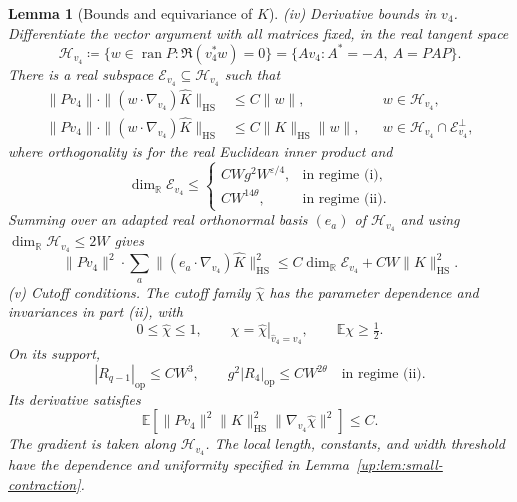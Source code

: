 \documentclass[11pt]{article}
\numberwithin{equation}{section}
\newtheorem{lemma}[theorem]{Lemma}
\theoremstyle{remark}
\newcommand{\E}{\mathbb E}
\newcommand{\R}{\mathbb R}
\newcommand{\ran}{\operatorname{ran}}
\newcommand{\HS}{\mathrm{HS}}
\begin{document}
\begin{lemma}[Bounds and equivariance of $K$]
\smallskip\noindent
\textup{(iv) Derivative bounds in $v_4$.}
Differentiate the vector argument with all matrices fixed, in the real
tangent space
\[
 \mathcal H_{v_4}\coloneqq\{w\in\ran P:\Re(v_4^*w)=0\}
 =\{Av_4:A^*=-A,\ A=PAP\}.
\]
There is a real subspace $\mathcal E_{v_4}\subseteq\mathcal H_{v_4}$ such that
\begin{equation}\label{su:eq:pair-source-regularity}
 \begin{aligned}
 \|Pv_4\|\cdot\|(w\cdot\nabla_{v_4})\widehat K\|_{\HS}
   &\le C\|w\|,&&w\in\mathcal H_{v_4},\\
 \|Pv_4\|\cdot\|(w\cdot\nabla_{v_4})\widehat K\|_{\HS}
   &\le C\|K\|_{\HS}\|w\|,
       &&w\in\mathcal H_{v_4}\cap\mathcal E_{v_4}^\perp,
 \end{aligned}
\end{equation}
where orthogonality is for the real Euclidean inner product and
\begin{equation}\label{su:eq:pair-exceptional-dimension}
 \dim_{\R}\mathcal E_{v_4}\le
 \begin{cases}
 CWg^2W^{\varepsilon/4},&\text{in regime (i)},\\
 CW^{14\theta},&\text{in regime (ii)}.
 \end{cases}
\end{equation}
Summing over an adapted real orthonormal basis $(e_a)$ of
$\mathcal H_{v_4}$ and using $\dim_{\R}\mathcal H_{v_4}\le2W$ gives
\begin{equation}\label{su:eq:pair-source-derivative-sum}
 \|Pv_4\|^2\cdot\sum_a
 \|(e_a\cdot\nabla_{v_4})\widehat K\|_{\HS}^2
 \le C\dim_{\R}\mathcal E_{v_4}+CW\|K\|_{\HS}^2.
\end{equation}
\smallskip\noindent
\textup{(v) Cutoff conditions.}
The cutoff family $\widehat\chi$ has the parameter dependence and
invariances in part (ii), with
\[
 0\le\widehat\chi\le1,\qquad
 \chi=\left.\widehat\chi\right|_{\widehat v_4=v_4},\qquad
 \E\chi\ge\tfrac12.
\]
On its support,
\[
 |R_{q-1}|_{\mathrm{op}}\le CW^3,\qquad
 g^2|R_4|_{\mathrm{op}}\le CW^{2\theta}\quad\text{in regime (ii)}.
\]
Its derivative satisfies
\begin{equation}\label{su:eq:pair-cutoff-derivative}
 \E\left[\|Pv_4\|^2\|K\|_{\HS}^2
       \|\nabla_{v_4}\widehat\chi\|^2\right]\le C.
\end{equation}
The gradient is taken along $\mathcal H_{v_4}$.
The local length, constants, and width threshold have the dependence
and uniformity specified in Lemma~\ref{up:lem:small-contraction}.
\end{lemma}
\end{document}
